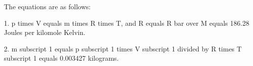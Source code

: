 The equations are as follows:

1. p times V equals m times R times T, and R equals R bar over M equals 186.28 Joules per kilomole Kelvin.

2. m subscript 1 equals p subscript 1 times V subscript 1 divided by R times T subscript 1 equals 0.003427 kilograms.